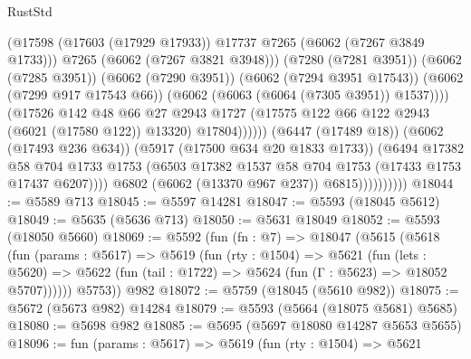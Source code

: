 \begin{lexlean}{RustStd}
\begin{coremodule}
                                          (@17598
                                            (@17603 (@17929 @17933))
                                            @17737
                                            @7265
                                            (@6062 (@7267 @3849 @1733)))
                                          @7265
                                          (@6062 (@7267 @3821 @3948)))
                                        (@7280 (@7281 @3951))
                                        (@6062 (@7285 @3951))
                                        (@6062 (@7290 @3951))
                                        (@6062 (@7294 @3951 @17543))
                                        (@6062 (@7299 @917 @17543 @66))
                                        (@6062 (@6063 (@6064 (@7305 @3951)) @1537))))
                                    (@17526
                                      @142
                                      @48
                                      @66
                                      @27
                                      @2943
                                      @1727
                                      (@17575 @122 @66 @122 @2943 (@6021 (@17580 @122)) @13320)
                                      @17804))))))
                          (@6447 (@17489 @18))
                          (@6062 (@17493 @236 @634))
                          (@5917 (@17500 @634 @20 @1833 @1733))
                          (@6494
                            @17382
                            @58
                            @704
                            @1733
                            @1753
                            (@6503 @17382 @1537 @58 @704 @1753 (@17433 @1753 @17437 @6207))))
                        @6802
                        (@6062 (@13370 @967 @237))
                        @6815))))))))))
@18044 := @5589 @713
@18045 := @5597 @14281
@18047 := @5593 (@18045 @5612)
@18049 := @5635 (@5636 @713)
@18050 := @5631 @18049
@18052 := @5593 (@18050 @5660)
@18069 := @5592
    (fun (fn : @7) =>
    @18047
      (@5615
        (@5618
          (fun (params : @5617) =>
          @5619
            (fun (rty : @1504) =>
            @5621
              (fun (lets : @5620) =>
              @5622 (fun (tail : @1722) => @5624 (fun (Γ : @5623) => @18052 @5707))))))
        @5753))
    @982
@18072 := @5759 (@18045 (@5610 @982))
@18075 := @5672 (@5673 @982) @14284
@18079 := @5593 (@5664 (@18075 @5681) @5685)
@18080 := @5698 @982
@18085 := @5695 (@5697 @18080 @14287 @5653 @5655)
@18096 := fun (params : @5617) =>
  @5619
    (fun (rty : @1504) =>
    @5621

\end{coremodule}
\end{lexlean}
